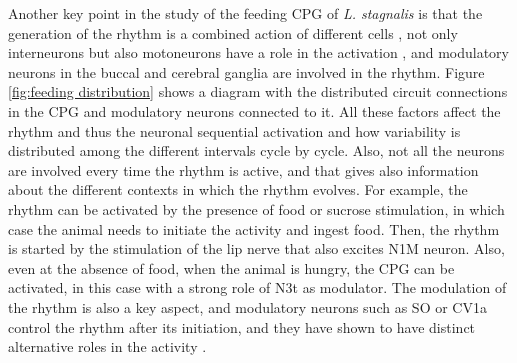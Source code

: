 Another key point in the study of the feeding CPG of \textit{L. stagnalis} is that the generation of the rhythm is a combined action of different cells \parencite{benjamin_distributed_2012}, not only interneurons but also motoneurons have a role in the activation \parencite{staras_patterngenerating_1998}, and modulatory neurons in the buccal and cerebral ganglia are involved in the rhythm. Figure \ref{fig:feeding distribution} shows a diagram with the distributed circuit connections in the CPG and modulatory neurons connected to it. All these factors affect the rhythm and thus the neuronal sequential activation and how variability is distributed among the different intervals cycle by cycle. Also, not all the neurons are involved every time the rhythm is active, and that gives also information about the different contexts in which the rhythm evolves. For example, the rhythm can be activated by the presence of food or sucrose stimulation, in which case the animal needs to initiate the activity and ingest food. Then, the rhythm is started by the stimulation of the lip nerve that also excites N1M neuron. Also, even at the absence of food, when the animal is hungry, the CPG can be activated, in this case with a strong role of N3t as modulator. The modulation of the rhythm is also a key aspect, and modulatory neurons such as SO or CV1a control the rhythm after its initiation, and they have shown to have distinct alternative roles in the activity \parencite{kemenes_multiple_2001}. 

